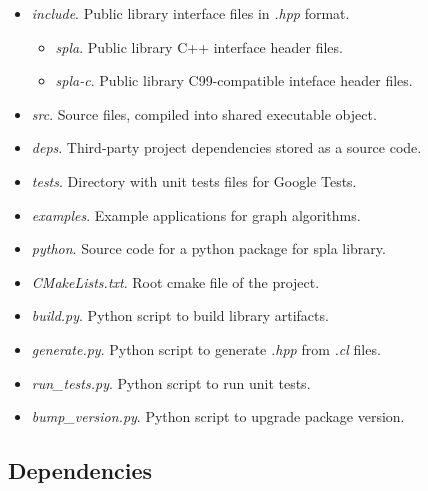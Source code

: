 \begin{itemize}[noitemsep,topsep=0pt,parsep=0pt,partopsep=0pt]
    \item {} \textit{ include}. Public library interface files in \textit{.hpp} format. 
    {
    \begin{itemize}[noitemsep,topsep=0pt,parsep=0pt,partopsep=0pt]
        \item {} \textit{spla}. Public library C++ interface header files.
        \item {} \textit{spla-c}. Public library C99-compatible inteface header files.
    \end{itemize}
    }
    \item {} \textit{src}. Source files, compiled into shared executable object.
    \item {} \textit{deps}. Third-party project dependencies stored as a source code.
    \item {} \textit{tests}. Directory with unit tests files for Google Tests.
    \item {} \textit{examples}. Example applications for graph algorithms.
    \item {} \textit{python}. Source code for a python package for spla library.
    \item {} \textit{CMakeLists.txt}. Root cmake file of the project.
    \item {} \textit{build.py}. Python script to build library artifacts.
    \item {} \textit{generate.py}. Python script to generate \textit{.hpp} from \textit{.cl} files.
    \item {} \textit{run\_tests.py}. Python script to run unit tests.
    \item {} \textit{bump\_version.py}. Python script to upgrade package version.
\end{itemize}

\subsection{Dependencies}


